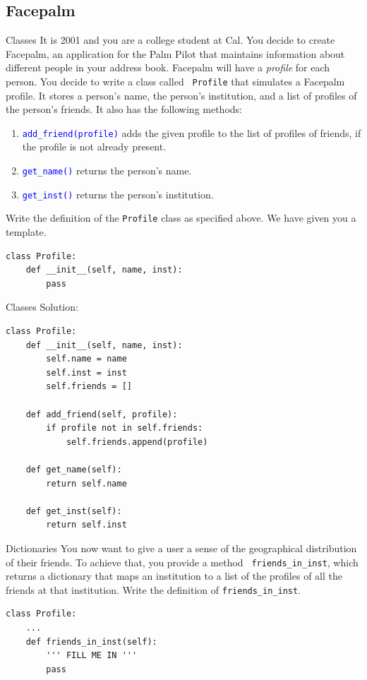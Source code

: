 \documentclass[9pt]{beamer}
\begin{document}
\subsection{Facepalm}
\begin{frame}[fragile]{Classes}
  It is 2001 and you are a college student at Cal. You decide to create {\sc
  Facepalm}, an application for the Palm Pilot that maintains information
  about different people in your address book. {\sc Facepalm} will have a
  {\em profile} for each person. You decide to write a class called {\tt
  Profile} that simulates a {\sc Facepalm} profile. It stores a person's
  name, the person's institution, and a list of profiles of the person's
  friends. It also has the following methods:

  \begin{enumerate}
    \item
      \textcolor{blue}{\tt add\_friend(profile)} adds the given profile to
      the list of profiles of friends, if the profile is not already
      present.
    \item
      \textcolor{blue}{\tt get\_name()} returns the person's name.
    \item
      \textcolor{blue}{\tt get\_inst()} returns the person's institution.
  \end{enumerate}

  Write the definition of the {\tt Profile} class as specified above. We
  have given you a template.

  \begin{lstlisting}
class Profile:
    def __init__(self, name, inst):
        pass
  \end{lstlisting}
\end{frame}

\begin{frame}[fragile]{Classes}
  Solution:
  \begin{lstlisting}[basicstyle=\small]
class Profile:
    def __init__(self, name, inst):
        self.name = name
        self.inst = inst
        self.friends = []

    def add_friend(self, profile):
        if profile not in self.friends:
            self.friends.append(profile)

    def get_name(self):
        return self.name

    def get_inst(self):
        return self.inst
  \end{lstlisting}
\end{frame}

\begin{frame}[fragile]{Dictionaries}
  You now want to give a user a sense of the geographical distribution of
  their friends. To achieve that, you provide a method {\tt
  friends\_in\_inst}, which returns a dictionary that maps an institution to
  a list of the profiles of all the friends at that institution. Write the
  definition of {\tt{friends\_in\_inst}}.

  \begin{lstlisting}
class Profile:
    ...
    def friends_in_inst(self):
        ''' FILL ME IN '''
        pass
  \end{lstlisting}
\end{frame}
\end{document}
